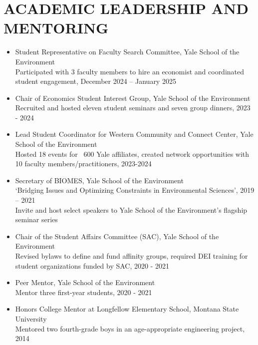 \documentclass[11pt]{article}
\begin{document}
\section*{ACADEMIC LEADERSHIP AND MENTORING}
\begin{itemize}[left=0pt]
    \item Student Representative on Faculty Search Committee, Yale School of the Environment \\
    Participated with 3 faculty members to hire an economist and coordinated student engagement, December 2024 – January 2025
    \item Chair of Economics Student Interest Group, Yale School of the Environment \\
    Recruited and hosted eleven student seminars and seven group dinners, 2023 - 2024
    \item Lead Student Coordinator for Western Community and Connect Center, Yale School of the Environment \\
    Hosted 18 events for ~600 Yale affiliates, created network opportunities with 10 faculty members/practitioners, 2023-2024
    \item Secretary of BIOMES, Yale School of the Environment \\
    ‘Bridging Issues and Optimizing Constraints in Environmental Sciences’, 2019 – 2021 \\
    Invite and host select speakers to Yale School of the Environment’s flagship seminar series
    \item Chair of the Student Affairs Committee (SAC), Yale School of the Environment \\
    Revised bylaws to define and fund affinity groups, required DEI training for student organizations funded by SAC, 2020 - 2021
    \item Peer Mentor, Yale School of the Environment \\
    Mentor three first-year students, 2020 - 2021
    \item Honors College Mentor at Longfellow Elementary School, Montana State University \\
    Mentored two fourth-grade boys in an age-appropriate engineering project, 2014
\end{itemize}
\end{document}
